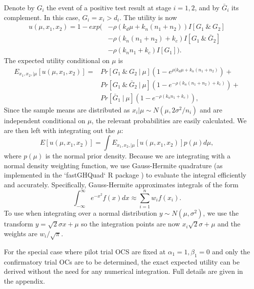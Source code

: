 \documentclass[sagev]{sagej}
\begin{document}
Denote by $G_i$ the event of a positive test result at stage $i = 1,2$, and by $\bar{G}_i$ its complement. In this case, $G_i = x_i > d_i$. The utility is now
\begin{equation}
\begin{split}
u(\mu, x_1, x_2) = 1 - exp(&-\rho(k_d\mu + k_n (n_1+n_2))I[G_1 ~\&~ G_2] \\ 
  &- \rho(k_n (n_1+n_2) + k_c)I[G_1 ~\&~ \bar{G}_2] \\
  &- \rho(k_n n_1 + k_c)I[G_1] ).
\end{split}
\end{equation}
The expected utility conditional on $\mu$ is
\begin{equation}\label{eqn:joint_cond_util}
\begin{split}
E_{x_1, x_2, | \mu}[u(\mu, x_1, x_2)] =& Pr[G_1 ~\&~ G_2  ~|~ \mu]\left(1-e^{\rho(k_d\mu + k_n(n_1+n_2)}\right) + \\
& Pr[G_1 ~\&~ \bar{G}_2  ~|~ \mu] \left(1- e^{-\rho(k_n (n_1+n_2) + k_c)} \right) + \\
& Pr[\bar{G}_1  ~|~ \mu] \left( 1-e^{-\rho(k_n n_1 + k_c)} \right),
\end{split}
\end{equation}
Since the sample means are distributed as $x_i | \mu \sim N(\mu, 2\sigma^2/n_i)$ and are independent conditional on $\mu$, the relevant probabilities are easily calculated. We are then left with integrating out the $\mu$:
\begin{equation}\label{eqn:exp_util}
E[u(\mu, x_1, x_2)] = \int E_{x_1, x_2, | \mu} [ u(\mu, x_1, x_2)] p(\mu) d\mu, 
\end{equation}
where $p(\mu)$ is the normal prior density. Because we are integrating with a normal density weighting function, we use Gauss-Hermite quadrature (as implemented in the `fastGHQuad` R package \cite{Blocker2018}) to evaluate the integral efficiently and accurately. Specifically, Gauss-Hermite approximates integrals of the form
$$
\int_{-\infty}^{\infty} e^{-x^2}f(x) dx \approx \sum_{i=1}^{n} w_i f(x_i).
$$
To use when integrating over a normal distribution $y \sim N(\mu, \sigma^2)$, we use the transform $y = \sqrt{2}\sigma x + \mu$ so the integration points are now $x_i\sqrt{2}\sigma + \mu$ and the weights are $w_i / \sqrt{\pi}$.

For the special case where pilot trial OCS are fixed at $\alpha_1 = 1, \beta_1 = 0$ and only the confirmatory trial OCs are to be determined, the exact expected utility can be derived without the need for any numerical integration. Full details are given in the appendix.
\end{document}
